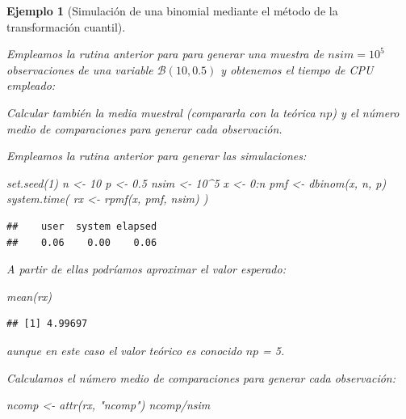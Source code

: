 \documentclass[
]{book}
\newenvironment{Shaded}{\begin{snugshade}}{\end{snugshade}}
\newcommand{\DecValTok}[1]{\textcolor[rgb]{0.00,0.00,0.81}{#1}}
\newcommand{\FloatTok}[1]{\textcolor[rgb]{0.00,0.00,0.81}{#1}}
\newcommand{\FunctionTok}[1]{\textcolor[rgb]{0.00,0.00,0.00}{#1}}
\newcommand{\NormalTok}[1]{#1}
\newcommand{\OtherTok}[1]{\textcolor[rgb]{0.56,0.35,0.01}{#1}}
\newcommand{\SpecialCharTok}[1]{\textcolor[rgb]{0.00,0.00,0.00}{#1}}
\newcommand{\StringTok}[1]{\textcolor[rgb]{0.31,0.60,0.02}{#1}}
\theoremstyle{break}
\newtheorem{example}{Ejemplo}[chapter]
\theoremstyle{nonumberplain}
\begin{document}
\begin{example}[Simulación de una binomial mediante el método de la transformación cuantil]
\protect\hypertarget{exm:binom-cuant}{}\label{exm:binom-cuant}

Empleamos la rutina anterior para para generar una muestra de \(nsim=10^{5}\) observaciones de una variable \(\mathcal{B}(10,0.5)\) y obtenemos el tiempo de CPU empleado:

Calcular también la
media muestral (compararla con la teórica \(np\)) y el número
medio de comparaciones para generar cada observación.

Empleamos la rutina anterior para generar las simulaciones:

\begin{Shaded}
\begin{Highlighting}[]
\FunctionTok{set.seed}\NormalTok{(}\DecValTok{1}\NormalTok{)}
\NormalTok{n }\OtherTok{\textless{}{-}} \DecValTok{10}
\NormalTok{p }\OtherTok{\textless{}{-}} \FloatTok{0.5}
\NormalTok{nsim }\OtherTok{\textless{}{-}} \DecValTok{10}\SpecialCharTok{\^{}}\DecValTok{5}
\NormalTok{x }\OtherTok{\textless{}{-}} \DecValTok{0}\SpecialCharTok{:}\NormalTok{n}
\NormalTok{pmf }\OtherTok{\textless{}{-}} \FunctionTok{dbinom}\NormalTok{(x, n, p)}
\FunctionTok{system.time}\NormalTok{( rx }\OtherTok{\textless{}{-}} \FunctionTok{rpmf}\NormalTok{(x, pmf, nsim) )}
\end{Highlighting}
\end{Shaded}

\begin{verbatim}
##    user  system elapsed 
##    0.06    0.00    0.06
\end{verbatim}

A partir de ellas podríamos aproximar el valor esperado:

\begin{Shaded}
\begin{Highlighting}[]
\FunctionTok{mean}\NormalTok{(rx)}
\end{Highlighting}
\end{Shaded}

\begin{verbatim}
## [1] 4.99697
\end{verbatim}

aunque en este caso el valor teórico es conocido \(np\) = 5.

Calculamos el número medio de comparaciones para generar cada observación:

\begin{Shaded}
\begin{Highlighting}[]
\NormalTok{ncomp }\OtherTok{\textless{}{-}} \FunctionTok{attr}\NormalTok{(rx, }\StringTok{"ncomp"}\NormalTok{)}
\NormalTok{ncomp}\SpecialCharTok{/}\NormalTok{nsim}
\end{Highlighting}
\end{Shaded}


\end{example}
\end{document}

